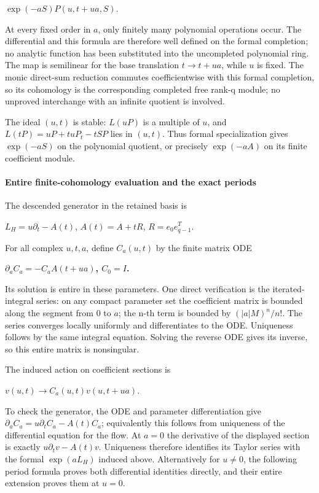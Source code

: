 \(\exp(-aS)P(u,t+ua,S)\).

At every fixed order in \(a\), only finitely many polynomial operations occur. The differential and this formula are therefore well defined on the formal completion; no analytic function has been substituted into the uncompleted polynomial ring. The map is semilinear for the base translation \(t\to t+ua\), while \(u\) is fixed. The monic direct-sum reduction commutes coefficientwise with this formal completion, so its cohomology is the corresponding completed free rank-q module; no unproved interchange with an infinite quotient is involved.

The ideal \((u,t)\) is stable: \(L(uP)\) is a multiple of \(u\), and \(L(tP)=uP+tu P_t-tSP\) lies in \((u,t)\). Thus formal specialization gives \(\exp(-aS)\) on the polynomial quotient, or precisely \(\exp(-aA)\) on its finite coefficient module.

\paragraph{Entire finite-cohomology evaluation and the exact periods}\label{endpoint-f1_scaling--entire-finite-cohomology-evaluation-and-the-exact-periods}

The descended generator in the retained basis is

\(L_H=u \partial_t-A(t)\), \(A(t)=A+tR\), \(R=e_0 e_{q-1}^T\).

For all complex \(u,t,a\), define \(C_a(u,t)\) by the finite matrix ODE

\textbf{\(\partial_a C_a=-C_a A(t+ua)\), \(C_0=I\).}

Its solution is entire in these parameters. One direct verification is the iterated-integral series: on any compact parameter set the coefficient matrix is bounded along the segment from \(0\) to \(a\); the n-th term is bounded by \((|a|M)^n/n!\). The series converges locally uniformly and differentiates to the ODE. Uniqueness follows by the same integral equation. Solving the reverse ODE gives its inverse, so this entire matrix is nonsingular.

The induced action on coefficient sections is

\(v(u,t) \to  C_a(u,t) v(u,t+ua)\).

To check the generator, the ODE and parameter differentiation give \(\partial_a C_a=u \partial_t C_a-A(t)C_a\); equivalently this follows from uniqueness of the differential equation for the flow. At \(a=0\) the derivative of the displayed section is exactly \(u \partial_t v-A(t)v\). Uniqueness therefore identifies its Taylor series with the formal \(\exp(aL_H)\) induced above. Alternatively for \(u\ne 0\), the following period formula proves both differential identities directly, and their entire extension proves them at \(u=0\).

